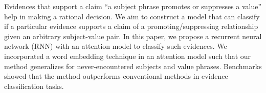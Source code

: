 Evidences that support a claim ``a subject phrase promotes or suppresses a value'' help in making a rational decision. We aim to construct a model that can classify if a particular evidence supports a claim of a promoting/suppressing relationship given an arbitrary subject-value pair. In this paper, we propose a recurrent neural network (RNN) with an attention model to classify such evidences. We incorporated a word embedding technique in an attention model such that our method generalizes for never-encountered subjects and value phrases. Benchmarks showed that the method outperforms conventional methods in evidence classification tasks.
